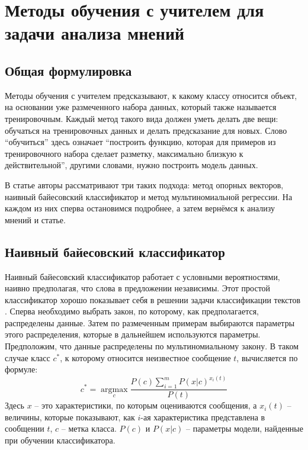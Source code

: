 \section{Методы обучения с учителем для задачи анализа мнений}

\subsection{Общая формулировка}
Методы обучения с учителем предсказывают, к какому классу относится объект, на основании уже
размеченного набора данных, который также называется тренировочным. Каждый метод такого вида должен
уметь делать две вещи: обучаться на тренировочных данных и делать предсказание для новых. Слово
``обучиться'' здесь означает ``построить функцию, которая для примеров из тренировочного набора
сделает разметку, максимально близкую к действительной'', другими словами, нужно построить модель
данных.

В статье \cite{pang2002thumbs} авторы рассматривают три таких подхода: метод опорных
векторов, наивный байесовский классификатор и метод мультиномиальной регрессии. На каждом из них
сперва остановимся подробнее, а затем вернёмся к анализу мнений и статье.

\subsection{Наивный байесовский классификатор}
Наивный байесовский классификатор \cite{citeulike:11350907} работает с условными вероятностями,
наивно предполагая, что слова в предложении независимы. Этот простой классификатор хорошо показывает
себя в решении задачи классификации текстов \cite{manning1999foundations}. Сперва необходимо выбрать закон,
по которому, как предполагается, распределены данные. Затем по размеченным примерам выбираются
параметры этого распределения, которые в дальнейшем используются параметры. Предположим, что данные
распределены по мультиномиальному закону. В таком случае класс $c^*$, к которому относится
неизвестное сообщение $t$, вычисляется по формуле:
$$c^* = \operatorname{arg max}\limits_c \frac{P(c) \sum_{i=1}^mP(x|c)^{x_i(t)}}{P(t)}$$
Здесь $x$ -- это характеристики, по которым оцениваются сообщения, а $x_i(t)$ -- величины, которые
показывают, как $i$-ая характеристика представлена в сообщении $t$, $c$ -- метка класса. $P(c)$ и $P(x|c)$ -- параметры
модели, найденные при обучении классификатора.

